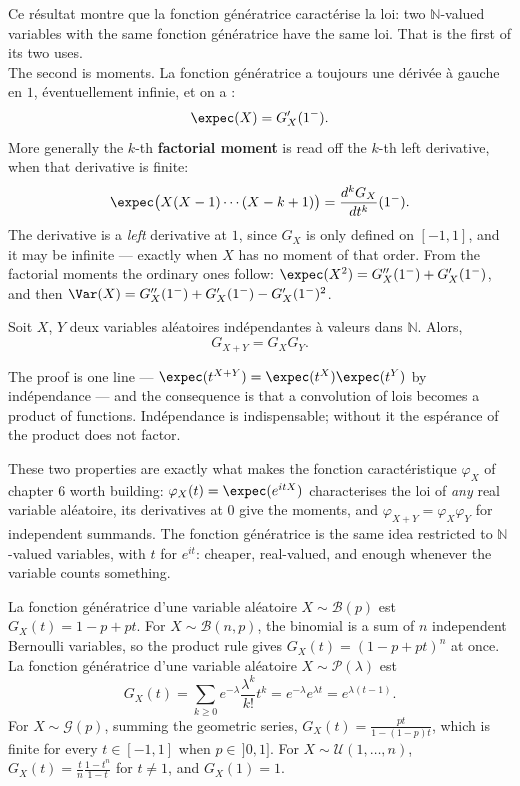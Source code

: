 Ce résultat montre que la fonction génératrice caractérise la loi: two
$\mathbb{N}$-valued variables with the same fonction génératrice have the same
loi. That is the first of its two uses.\\

The second is moments. La fonction génératrice a toujours une dérivée à gauche
en $1$, éventuellement infinie, et on a :
\[ \expec(X) = G_{X}'(1^{-}). \]
More generally the $k$-th \textbf{factorial moment} is read off the $k$-th
left derivative, when that derivative is finite:
\[ \expec\big( X(X-1)\cdots(X-k+1) \big)
     = \frac{d^{k} G_{X}}{dt^{k}}(1^{-}). \]
The derivative is a \emph{left} derivative at $1$, since $G_{X}$ is only defined
on $[-1,1]$, and it may be infinite --- exactly when $X$ has no moment of that
order. From the factorial moments the ordinary ones follow:
$\expec(X^{2}) = G_{X}''(1^{-}) + G_{X}'(1^{-})$, and then
$\Var(X) = G_{X}''(1^{-}) + G_{X}'(1^{-}) - G_{X}'(1^{-})^{2}$.

\begin{prop}
  Soit $X$, $Y$ deux variables aléatoires indépendantes à valeurs dans
  $\mathbb{N}$. Alors,
  \[ G_{X+Y} = G_{X} G_{Y}. \]
\end{prop}

The proof is one line --- $\expec(t^{X+Y}) = \expec(t^{X})\expec(t^{Y})$ by
indépendance --- and the consequence is that a convolution of lois becomes a
product of functions. Indépendance is indispensable; without it the espérance of
the product does not factor.

\begin{remark}
  These two properties are exactly what makes the fonction caractéristique
  $\varphi_{X}$ of chapter 6 worth building: $\varphi_{X}(t) = \expec(e^{itX})$
  characterises the loi of \emph{any} real variable aléatoire, its
  derivatives at $0$ give the moments, and $\varphi_{X+Y} = \varphi_{X}\varphi_{Y}$ for
  independent summands. The fonction génératrice is the same idea restricted to
  $\mathbb{N}$-valued variables, with $t$ for $e^{it}$: cheaper, real-valued, and
  enough whenever the variable counts something.
\end{remark}

\begin{example}
  La fonction génératrice d'une variable aléatoire $X \sim \mathcal{B}(p)$ est
  $G_{X}(t) = 1 - p + pt$. For
  $X \sim \mathcal{B}(n,p)$, the binomial is a sum of $n$ independent Bernoulli
  variables, so the product rule gives $G_{X}(t) = (1-p+pt)^{n}$ at once.\\

  La fonction génératrice d'une variable aléatoire $X \sim \mathcal{P}(\lambda)$
  est
  \[ G_{X}(t) = \sum_{k \ge 0} e^{-\lambda} \frac{\lambda^{k}}{k!} t^{k}
       = e^{-\lambda} e^{\lambda t} = e^{\lambda(t-1)}. \]
  For $X \sim \mathcal{G}(p)$, summing the geometric series,
  $G_{X}(t) = \frac{pt}{1 - (1-p)t}$, which is finite for every
  $t \in [-1,1]$ when $p \in\, ]0,1]$. For $X \sim \mathcal{U}(1,\dots,n)$,
  $G_{X}(t) = \frac{t}{n}\frac{1-t^{n}}{1-t}$ for $t \ne 1$, and $G_{X}(1) = 1$.
\end{example}

